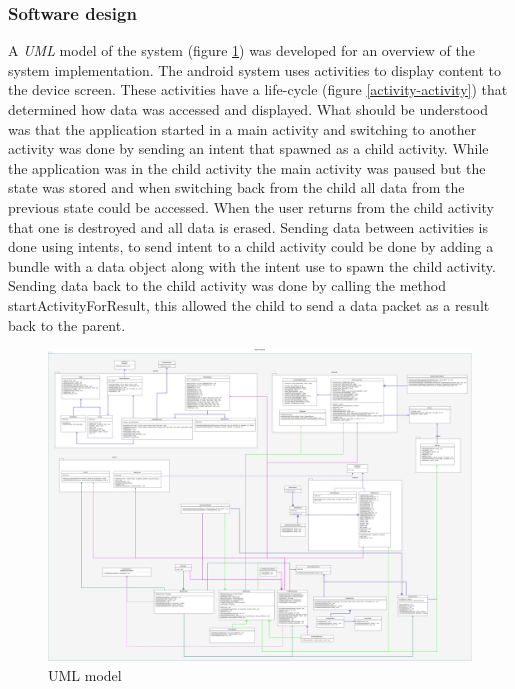 \subsubsection{Software design}
A \textit{UML}\cite{uml} model of the system (figure \ref{android-uml}) was developed for an overview of the system implementation. The android system uses activities\cite{activity} to display content to the device screen. These activities have a life-cycle (figure \ref{activity-activity}) that determined how data was accessed and displayed. What should be understood was that the application started in a main activity and switching to another activity was done by sending an intent that spawned as a child activity. While the application was in the child activity the main activity was paused but the state was stored and when switching back from the child all data from the previous state could be accessed. When the user returns from the child activity that one is destroyed and all data is erased. Sending data between activities is done using intents, to send intent to a child activity could be done by adding a bundle with a data object along with the intent use to spawn the child activity. Sending data back to the child activity was done by calling the method startActivityForResult, this allowed the child to send a data packet as a result back to the parent. 
\begin{figure}[H]
\centering
\includegraphics[width=1\textwidth]{Figures/uml.png}
\caption{UML model}
\label{android-uml}
\end{figure}
